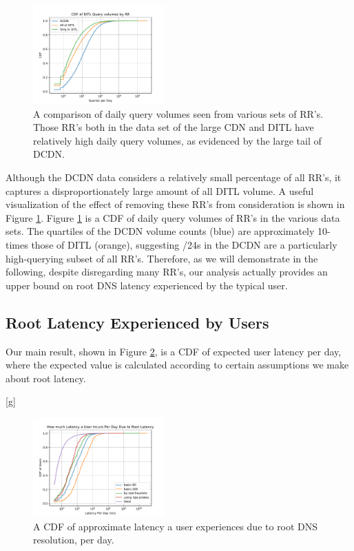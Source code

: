 \documentclass[sigconf,nonacm,10pt]{acmart}
\begin{document}
\begin{figure}
    \centering
    \includegraphics[width=0.45\textwidth]{figures/ditl_volume_comparisons.pdf}
    \caption{A comparison of daily query volumes seen from various sets of RR's. Those RR's both in the data set of the large CDN and DITL have relatively high daily query volumes, as evidenced by the large tail of DCDN. }
    \label{fig:ditl_volume_comparisons}
\end{figure}

Although the DCDN data considers a relatively small percentage of all
RR's, it captures a disproportionately large amount of all DITL volume.
A useful visualization of the effect of removing these RR's from
consideration is shown in Figure \ref{fig:ditl_volume_comparisons}.
Figure \ref{fig:ditl_volume_comparisons} is a CDF of daily query volumes
of RR's in the various data sets. The quartiles of the DCDN volume
counts (blue) are approximately 10-times those of DITL (orange),
suggesting /24s in the DCDN are a particularly high-querying subset of
all RR's. Therefore, as we will demonstrate in the following, despite
disregarding many RR's, our analysis actually provides an upper bound on
root DNS latency experienced by the typical user.

\subsection{Root Latency Experienced by
Users}\label{root-latency-experienced-by-users-1}

\label{sec:rr_global_look_analysis} Our main result, shown in Figure
\ref{fig:user_root_latency_per_day}, is a CDF of expected user latency
per day, where the expected value is calculated according to certain
assumptions we make about root latency.

{[}g{]}

\begin{figure}
    \centering
    \includegraphics[width=0.45\textwidth]{figures/user_root_latency_per_day.pdf}
    \caption{A CDF of approximate latency a user experiences due to root DNS resolution, per day.}
    \label{fig:user_root_latency_per_day}
\end{figure}
\end{document}
